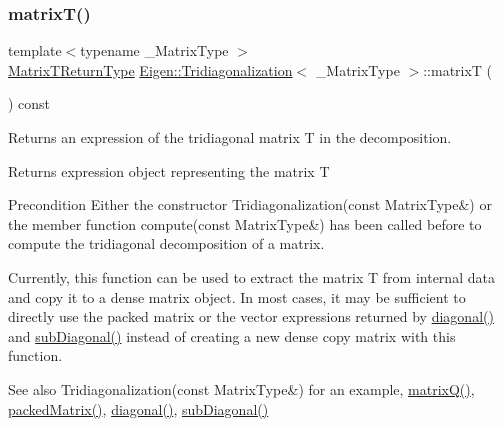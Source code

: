 \subsubsection{\texorpdfstring{matrixT()}{matrixT()}}
{\footnotesize\ttfamily template$<$typename \+\_\+\+Matrix\+Type $>$ \\
\mbox{\hyperlink{struct_eigen_1_1internal_1_1_tridiagonalization_matrix_t_return_type}{Matrix\+T\+Return\+Type}} \mbox{\hyperlink{class_eigen_1_1_tridiagonalization}{Eigen\+::\+Tridiagonalization}}$<$ \+\_\+\+Matrix\+Type $>$\+::matrixT (\begin{DoxyParamCaption}{ }\end{DoxyParamCaption}) const\hspace{0.3cm}{\ttfamily [inline]}}



Returns an expression of the tridiagonal matrix T in the decomposition. 

\begin{DoxyReturn}{Returns}
expression object representing the matrix T
\end{DoxyReturn}
\begin{DoxyPrecond}{Precondition}
Either the constructor Tridiagonalization(const Matrix\+Type\&) or the member function compute(const Matrix\+Type\&) has been called before to compute the tridiagonal decomposition of a matrix.
\end{DoxyPrecond}
Currently, this function can be used to extract the matrix T from internal data and copy it to a dense matrix object. In most cases, it may be sufficient to directly use the packed matrix or the vector expressions returned by \mbox{\hyperlink{class_eigen_1_1_tridiagonalization_a0b7ff4860aa6f7c0761b1059c012fd8e}{diagonal()}} and \mbox{\hyperlink{class_eigen_1_1_tridiagonalization_ac423dbb91157c159bdcb4b5a8371232e}{sub\+Diagonal()}} instead of creating a new dense copy matrix with this function.

\begin{DoxySeeAlso}{See also}
Tridiagonalization(const Matrix\+Type\&) for an example, \mbox{\hyperlink{class_eigen_1_1_tridiagonalization_a000f7392eda930576ffd2af1fae54af2}{matrix\+Q()}}, \mbox{\hyperlink{class_eigen_1_1_tridiagonalization_a47858b3895e64acafb1bb2e97f98a154}{packed\+Matrix()}}, \mbox{\hyperlink{class_eigen_1_1_tridiagonalization_a0b7ff4860aa6f7c0761b1059c012fd8e}{diagonal()}}, \mbox{\hyperlink{class_eigen_1_1_tridiagonalization_ac423dbb91157c159bdcb4b5a8371232e}{sub\+Diagonal()}} 
\end{DoxySeeAlso}
\mbox{\label{class_eigen_1_1_tridiagonalization_a47858b3895e64acafb1bb2e97f98a154}} 
